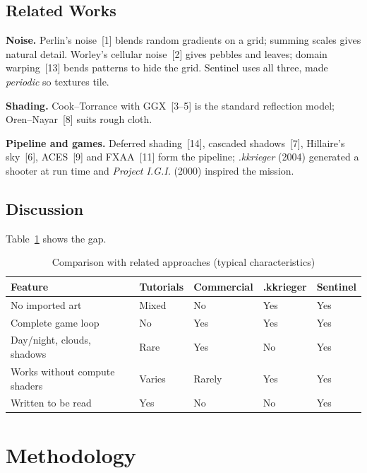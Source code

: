 \documentclass[12pt,a4paper,oneside]{report}
\begin{document}
\section{Related Works}
\textbf{Noise.} Perlin's noise~[1] blends random gradients on a grid; summing scales gives natural detail. Worley's cellular noise~[2] gives pebbles and leaves; domain warping~[13] bends patterns to hide the grid. Sentinel uses all three, made \emph{periodic} so textures tile.

\textbf{Shading.} Cook--Torrance with GGX~[3--5] is the standard reflection model; Oren--Nayar~[8] suits rough cloth.


\textbf{Pipeline and games.} Deferred shading~[14], cascaded shadows~[7], Hillaire's sky~[6], ACES~[9] and FXAA~[11] form the pipeline; \textit{.kkrieger} (2004) generated a shooter at run time and \textit{Project I.G.I.} (2000) inspired the mission.

\section{Discussion}
Table~\ref{tab:compare} shows the gap.

\begin{table}[H]
	\caption{Comparison with related approaches (typical characteristics)}\label{tab:compare}
	\small{}
	\begin{tabularx}{\linewidth}{lXXXX}
		\toprule \textbf{Feature} & \textbf{Tutorials} & \textbf{Commercial} & \textbf{.kkrieger} & \textbf{Sentinel}\\ \midrule
		No imported art & Mixed & No & Yes & Yes\\
		Complete game loop & No & Yes & Yes & Yes\\
		Day/night, clouds, shadows & Rare & Yes & No & Yes\\
		Works without compute shaders & Varies & Rarely & Yes & Yes\\
		Written to be read & Yes & No & No & Yes\\
		\bottomrule
	\end{tabularx}
\end{table}

\chapter{Methodology}
\end{document}
